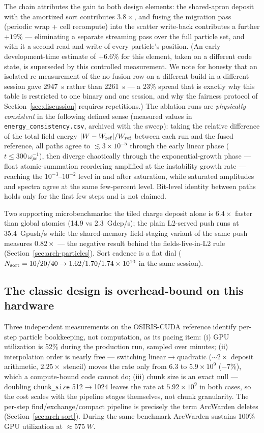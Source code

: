 \documentclass[11pt]{article}
\newcommand{\arcw}{ArcWarden}
\begin{document}
The chain attributes the gain to both design elements: the shared-apron
deposit with the amortized sort contributes $3.8\times$, and fusing
the migration pass (periodic wrap + cell recompute) into the scatter
write-back contributes a further $+19\%$ --- eliminating a separate
streaming pass over the full particle set, and with it a second read
and write of every particle's position. (An early development-time
estimate of $+6.6\%$ for this element, taken on a different code
state, is superseded by this controlled measurement. We note for
honesty that an isolated re-measurement of the no-fusion row on a
different build in a different session gave \SI{2947}{s} rather than
\SI{2261}{s} --- a 23\% spread that is exactly why this table is
restricted to one binary and one session, and why the fairness
protocol of Section~\ref{sec:discussion} requires repetitions.) The ablation runs are \emph{physically consistent} in the
following defined sense (measured values in
\texttt{energy\_consistency.csv}, archived with the sweep): taking
the relative difference of the total field energy
$|W-W_{\rm ref}|/W_{\rm ref}$ between each run and the fused
reference, all paths agree to $\lesssim3\times10^{-5}$ through the
early linear phase ($t\le300\,\omega_{pe}^{-1}$), then diverge
chaotically through the exponential-growth phase --- float
atomic-summation reordering amplified at the instability growth rate
--- reaching the $10^{-3}$--$10^{-2}$ level in and after saturation,
while saturated amplitudes and spectra agree at the same few-percent
level. Bit-level identity between paths holds only for the first few
steps and is not claimed.

Two supporting microbenchmarks: the tiled charge deposit alone is
$6.4\times$ faster than global atomics (14.9 vs 2.3~Gdep/s); the plain
L2-served push runs at 35.4~Gpush/s while the shared-memory
field-staging variant of the same push measures $0.82\times$ --- the
negative result behind the fields-live-in-L2 rule
(Section~\ref{sec:arch-particles}). Sort cadence is a flat dial
($N_{\rm sort}=10/20/40 \to 1.62/1.70/1.74\times10^{10}$ in the same
session).

\subsection{The classic design is overhead-bound on this hardware}
\label{sec:overhead}
Three independent measurements on the OSIRIS-CUDA reference identify
per-step particle bookkeeping, not computation, as its pacing item:
(i) GPU utilization is 52\% during the production run, sampled over
minutes; (ii) interpolation order is nearly free --- switching
linear$\to$quadratic ($\sim2\times$ deposit arithmetic, $2.25\times$
stencil) moves the rate only from $6.3$ to $5.9\times10^{9}$ ($-7\%$),
which a compute-bound code cannot do; (iii) chunk size is an exact
null --- doubling \texttt{chunk\_size} 512$\to$1024 leaves the rate at
$5.92\times10^{9}$ in both cases, so the cost scales with the pipeline
stages themselves, not chunk granularity. The per-step
find/exchange/compact pipeline is precisely the term \arcw{} deletes
(Section~\ref{sec:arch-sort}). During the same benchmark \arcw{}
sustains 100\% GPU utilization at $\approx\SI{575}{W}$.
\end{document}
